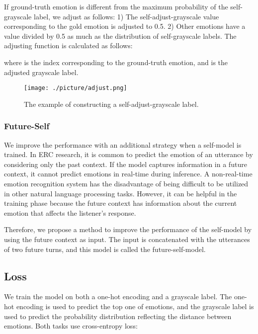 \documentclass[a4paper]{article}
\begin{document}
If ground-truth emotion is different from the maximum probability of the self-grayscale label, we adjust as follows: 1) The self-adjust-grayscale value corresponding to the gold emotion is adjusted to 0.5. 2) Other emotions have a value divided by 0.5 as much as the distribution of self-grayscale labels. The adjusting function is calculated as follows:



where  is the index corresponding to the ground-truth emotion, and  is the adjusted grayscale label.


\begin{figure}[!t]
    \centering 
    \texttt{[image: ./picture/adjust.png]}
    \caption{The example of constructing a self-adjust-grayscale label.}
    \label{fig:adjust}
\end{figure}

\subsubsection{Future-Self}
We improve the performance with an additional strategy when a self-model is trained. In ERC research, it is common to predict the emotion of an utterance by considering only the past context. If the model captures information in a future context, it cannot predict emotions in real-time during inference. A non-real-time emotion recognition system has the disadvantage of being difficult to be utilized in other natural language processing tasks. However, it can be helpful in the training phase because the future context has information about the current emotion that affects the listener's response. 


Therefore, we propose a method to improve the performance of the self-model by using the future context as input. The input is concatenated with the utterances of two future turns, and this model is called the future-self-model. 



\subsection{Loss}
We train the model on both a one-hot encoding and a grayscale label. The one-hot encoding is used to predict the top one of emotions, and the grayscale label is used to predict the probability distribution reflecting the distance between emotions. Both tasks use cross-entropy loss:
\end{document}

